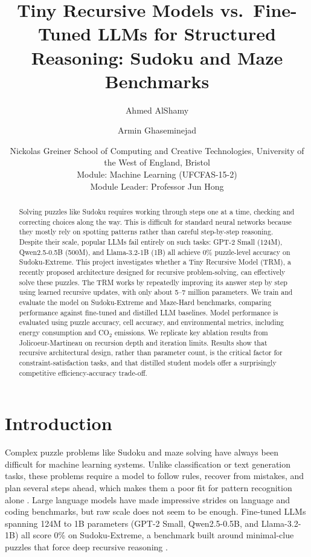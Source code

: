 \documentclass{article}
\title{Tiny Recursive Models vs.\ Fine-Tuned LLMs for Structured Reasoning: Sudoku and Maze Benchmarks}
\author{
Ahmed AlShamy
\and
Armin Ghaseminejad
\and
Nickolas Greiner
\affiliations
School of Computing and Creative Technologies, University of the West of England, Bristol\\
Module: Machine Learning (UFCFAS-15-2)\\
Module Leader: Professor Jun Hong
}
\begin{document}
\maketitle


\begin{abstract}
Solving puzzles like Sudoku requires working through steps one at a time, checking and correcting choices along the way. This is difficult for standard neural networks because they mostly rely on spotting patterns rather than careful step-by-step reasoning. Despite their scale, popular LLMs fail entirely on such tasks: GPT-2 Small (124M), Qwen2.5-0.5B (500M), and Llama-3.2-1B (1B) all achieve 0\% puzzle-level accuracy on Sudoku-Extreme. This project investigates whether a Tiny Recursive Model (TRM), a recently proposed architecture designed for recursive problem-solving, can effectively solve these puzzles. The TRM works by repeatedly improving its answer step by step using learned recursive updates, with only about 5--7 million parameters. We train and evaluate the model on Sudoku-Extreme and Maze-Hard benchmarks, comparing performance against fine-tuned and distilled LLM baselines. Model performance is evaluated using puzzle accuracy, cell accuracy, and environmental metrics, including energy consumption and CO$_2$ emissions. We replicate key ablation results from Jolicoeur-Martineau  on recursion depth and iteration limits. Results show that recursive architectural design, rather than parameter count, is the critical factor for constraint-satisfaction tasks, and that distilled student models offer a surprisingly competitive efficiency-accuracy trade-off.
\end{abstract}


\section{Introduction}

Complex puzzle problems like Sudoku and maze solving have always been difficult for machine learning systems. Unlike classification or text generation tasks, these problems require a model to follow rules, recover from mistakes, and plan several steps ahead, which makes them a poor fit for pattern recognition alone \cite{Wang2024}. Large language models have made impressive strides on language and coding benchmarks, but raw scale does not seem to be enough. Fine-tuned LLMs spanning 124M to 1B parameters (GPT-2 Small, Qwen2.5-0.5B, and Llama-3.2-1B) all score 0\% on Sudoku-Extreme, a benchmark built around minimal-clue puzzles that force deep recursive reasoning \cite{JolicoeurMartineau2025}.
\end{document}
